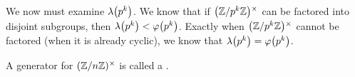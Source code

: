 \begin{remark}
  We now must examine $\lambdaf{p^k}$. We know that if $\Zmodx{p^k}$ can
  be factored into disjoint subgroups, then $\lambdaf{p^k} <
  \vphif{p^k}$. Exactly when $\Zmodx{p^k}$ cannot be factored (when it
  is already cyclic), we know that $\lambdaf{p^k} = \vphif{p^k}$.

  A generator for $\Zmodx{n}$ is called a .
\end{remark}

